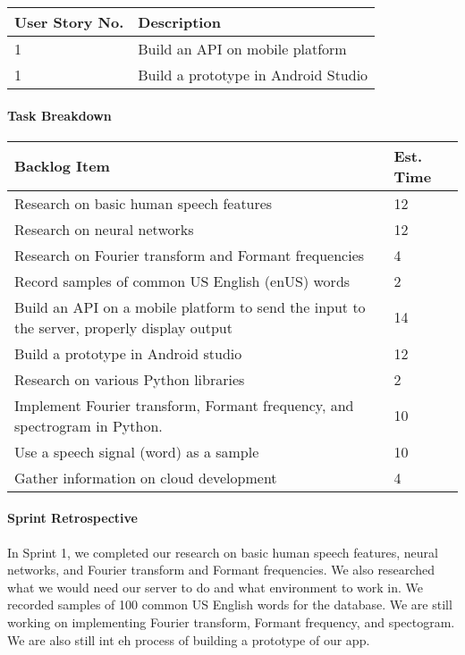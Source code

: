 \begin{table}[htbp]
    \centering
    \begin{tabularx}{\textwidth}{l|l}
        User Story No. & Description\\
        \hline
        1 & Build an API on mobile platform\\
        1 & Build a prototype in Android Studio\\
    \end{tabularx}
\end{table}

\paragraph{Task Breakdown}
\begin{table}[htbp]
    \centering
    \begin{tabularx}{\textwidth}{l|l}
        Backlog Item & Est. Time\\
        \hline
        Research on basic human speech features & 12\\
        Research on neural networks & 12\\
        Research on Fourier transform and Formant frequencies & 4\\
        Record samples of common US English (enUS) words & 2\\
        Build an API on a mobile platform to send the input to the server, properly display output & 14\\
        Build a prototype in Android studio & 12\\
        Research on various Python libraries & 2\\
        Implement Fourier transform, Formant frequency, and spectrogram in Python. & 10\\
        Use a speech signal (word) as a sample & 10\\
        Gather information on cloud development & 4\\
    \end{tabularx}
\end{table}

\paragraph{Sprint Retrospective}
In Sprint 1, we completed our research on basic human speech features, neural networks, and Fourier transform and Formant frequencies. We also researched what we would need our server to do and what environment to work in. We recorded samples of 100 common US English words for the database. We are still working on implementing Fourier transform, Formant frequency, and spectogram. We are also still int eh process of building a prototype of our app.
